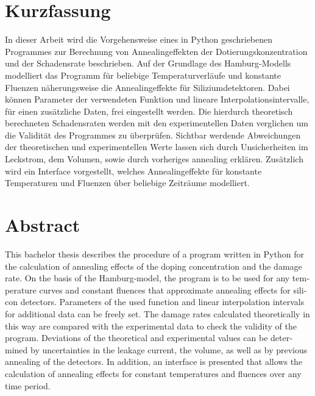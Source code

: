 \thispagestyle{plain}

\section*{Kurzfassung}
In dieser Arbeit wird die Vorgehensweise eines in Python geschriebenen Programmes zur
Berechnung von Annealingeffekten der Dotierungskonzentration und der Schadensrate
beschrieben. Auf der Grundlage des Hamburg-Modells modelliert das Programm für beliebige
Temperaturverläufe und konstante Fluenzen näherungsweise die Annealingeffekte für Siliziumdetektoren.
Dabei können Parameter der verwendeten Funktion und lineare Interpolationsintervalle, für einen
zusätzliche Daten, frei eingestellt werden.
Die hierdurch theoretisch berechneten Schadensraten werden mit den experimentellen Daten verglichen
um die Validität des Programmes zu überprüfen. Sichtbar werdende Abweichungen der
theoretischen und experimentellen Werte lassen sich durch Unsicherheiten im Leckstrom,
dem Volumen, sowie durch vorheriges annealing erklären.
Zusätzlich wird ein Interface vorgestellt, welches Annealingeffekte für konstante Temperaturen und Fluenzen
über beliebige Zeiträume modelliert.

\section*{Abstract}
\begin{english}
  This bachelor thesis describes the procedure of a program written in Python for the
  calculation of annealing effects of the doping concentration and the damage rate.
  On the basis of the Hamburg-model, the program is to be used for any
  temperature curves and constant fluences that approximate annealing effects for silicon detectors.
  Parameters of the used function and linear interpolation intervals for
  additional data can be freely set.
  The damage rates calculated theoretically in this way are compared with the experimental data
  to check the validity of the program. Deviations of the
  theoretical and experimental values can be determined by uncertainties in the leakage current,
  the volume, as well as by previous annealing of the detectors.
  In addition, an interface is presented that allows the calculation of annealing effects for constant temperatures and fluences
  over any time period.

\end{english}
